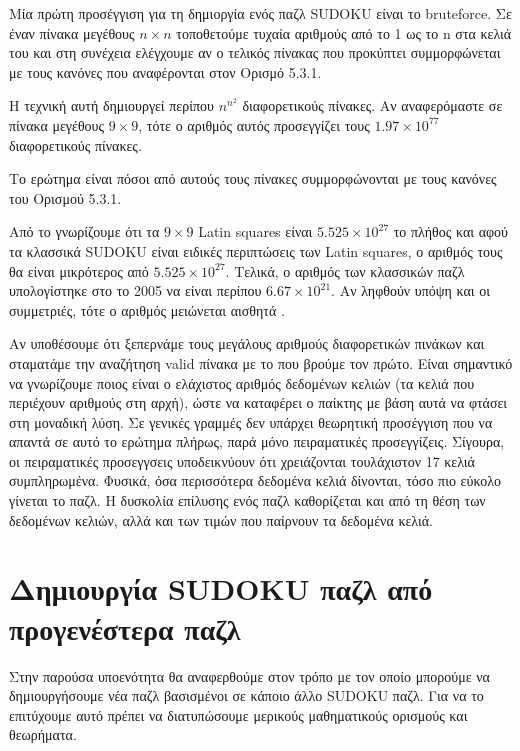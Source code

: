 \documentclass[12pt]{book}
\theoremstyle{definition}
\begin{document}
Μία πρώτη προσέγγιση για τη δημιοργία ενός παζλ SUDOKU είναι το bruteforce. Σε έναν πίνακα μεγέθους \(n \times n\) τοποθετούμε τυχαία αριθμούς από το 1 ως το n στα κελιά του και στη συνέχεια ελέγχουμε αν ο τελικός πίνακας που προκύπτει συμμορφώνεται με τους κανόνες που αναφέρονται στον Ορισμό 5.3.1. \par

Η τεχνική αυτή δημιουργεί περίπου \(n^{n^2}\) διαφορετικούς πίνακες. Αν αναφερόμαστε σε πίνακα μεγέθους \(9 \times 9\), τότε ο αριθμός αυτός προσεγγίζει τους \(1.97\times10^{77}\) διαφορετικούς πίνακες. \par 

Το ερώτημα είναι πόσοι από αυτούς τους πίνακες συμμορφώνονται με τους κανόνες του Ορισμού 5.3.1. \par

Από το \cite{6} γνωρίζουμε ότι τα \(9 \times 9\) Latin squares είναι \(5.525\times10^{27}\) το πλήθος και αφού τα κλασσικά SUDOKU είναι ειδικές περιπτώσεις των Latin squares, ο αριθμός τους θα είναι μικρότερος από \(5.525\times10^{27}\). Τελικά, ο αριθμός των κλασσικών παζλ υπολογίστηκε στο \cite{7} το 2005 να είναι περίπου \(6.67\times10^{21}\). Αν ληφθούν υπόψη και οι συμμετριές, τότε ο αριθμός μειώνεται αισθητά \cite{8}.

Αν υποθέσουμε ότι ξεπερνάμε τους μεγάλους αριθμούς διαφορετικών πινάκων και σταματάμε την αναζήτηση valid πίνακα με το που βρούμε τον πρώτο. Είναι σημαντικό να γνωρίζουμε ποιος είναι ο ελάχιστος αριθμός δεδομένων κελιών (τα κελιά που περιέχουν αριθμούς στη αρχή), ώστε να καταφέρει ο παίκτης με βάση αυτά να φτάσει στη μοναδική λύση. Σε γενικές γραμμές δεν υπάρχει θεωρητική προσέγγιση που να απαντά σε αυτό το ερώτημα πλήρως, παρά μόνο πειραματικές προσεγγίζεις. Σίγουρα, οι πειραματικές προσεγγσεις υποδεικνύουν ότι χρειάζονται τουλάχιστον 17 κελιά συμπληρωμένα. Φυσικά, όσα περισσότερα δεδομένα κελιά δίνονται, τόσο πιο εύκολο γίνεται το παζλ. Η δυσκολία επίλυσης ενός παζλ καθορίζεται και από τη θέση των δεδομένων κελιών, αλλά και των τιμών που παίρνουν τα δεδομένα κελιά.

\section{Δημιουργία SUDOKU παζλ από προγενέστερα παζλ}

Στην παρούσα υποενότητα θα αναφερθούμε στον τρόπο με τον οποίο μπορούμε να δημιουργήσουμε νέα παζλ βασισμένοι σε κάποιο άλλο SUDOKU παζλ. Για να το επιτύχουμε αυτό πρέπει να διατυπώσουμε μερικούς μαθηματικούς ορισμούς και θεωρήματα. \par
\end{document}
